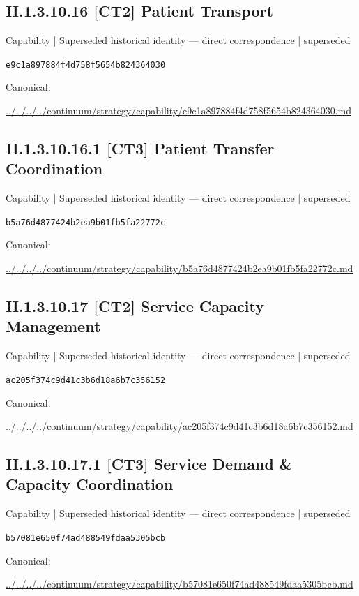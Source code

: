 \documentclass[10pt,a4paper]{article}
\begin{document}
\subsection*{II.1.3.10.16 [CT2] Patient Transport}
{\small Capability | Superseded historical identity — direct correspondence | superseded}\par
\texttt{e9c1a897884f4d758f5654b824364030}\par
Canonical: \par
{\footnotesize\url{../../../../continuum/strategy/capability/e9c1a897884f4d758f5654b824364030.md}}\par
\subsection*{II.1.3.10.16.1 [CT3] Patient Transfer Coordination}
{\small Capability | Superseded historical identity — direct correspondence | superseded}\par
\texttt{b5a76d4877424b2ea9b01fb5fa22772c}\par
Canonical: \par
{\footnotesize\url{../../../../continuum/strategy/capability/b5a76d4877424b2ea9b01fb5fa22772c.md}}\par
\subsection*{II.1.3.10.17 [CT2] Service Capacity Management}
{\small Capability | Superseded historical identity — direct correspondence | superseded}\par
\texttt{ac205f374c9d41c3b6d18a6b7c356152}\par
Canonical: \par
{\footnotesize\url{../../../../continuum/strategy/capability/ac205f374c9d41c3b6d18a6b7c356152.md}}\par
\subsection*{II.1.3.10.17.1 [CT3] Service Demand \& Capacity Coordination}
{\small Capability | Superseded historical identity — direct correspondence | superseded}\par
\texttt{b57081e650f74ad488549fdaa5305bcb}\par
Canonical: \par
{\footnotesize\url{../../../../continuum/strategy/capability/b57081e650f74ad488549fdaa5305bcb.md}}\par
\end{document}
